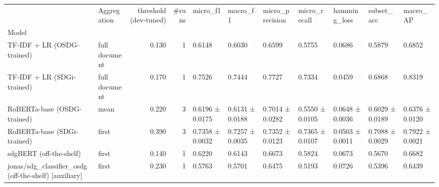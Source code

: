 \begin{tabular}{llrrlllllll}
\toprule
 & Aggregation & threshold (dev-tuned) & #runs & micro_f1 & macro_f1 & micro_precision & micro_recall & hamming_loss & subset_acc & macro_AP \\
Model &  &  &  &  &  &  &  &  &  &  \\
\midrule
TF-IDF + LR (OSDG-trained) & full document & 0.130 & 1 & 0.6148 & 0.6030 & 0.6599 & 0.5755 & 0.0686 & 0.5879 & 0.6852 \\
TF-IDF + LR (SDGi-trained) & full document & 0.170 & 1 & 0.7526 & 0.7444 & 0.7727 & 0.7334 & 0.0459 & 0.6868 & 0.8319 \\
RoBERTa-base (OSDG-trained) & mean & 0.220 & 3 & 0.6196 ± 0.0175 & 0.6131 ± 0.0188 & 0.7014 ± 0.0282 & 0.5550 ± 0.0105 & 0.0648 ± 0.0036 & 0.6029 ± 0.0189 & 0.6376 ± 0.0120 \\
RoBERTa-base (SDGi-trained) & first & 0.390 & 3 & 0.7358 ± 0.0032 & 0.7257 ± 0.0035 & 0.7352 ± 0.0123 & 0.7365 ± 0.0107 & 0.0503 ± 0.0011 & 0.7088 ± 0.0029 & 0.7922 ± 0.0021 \\
sdgBERT (off-the-shelf) & first & 0.140 & 1 & 0.6220 & 0.6143 & 0.6673 & 0.5824 & 0.0673 & 0.5670 & 0.6682 \\
jonas/sdg_classifier_osdg (off-the-shelf)  [auxiliary] & first & 0.230 & 1 & 0.5763 & 0.5701 & 0.6475 & 0.5193 & 0.0726 & 0.5396 & 0.6439 \\
\bottomrule
\end{tabular}
